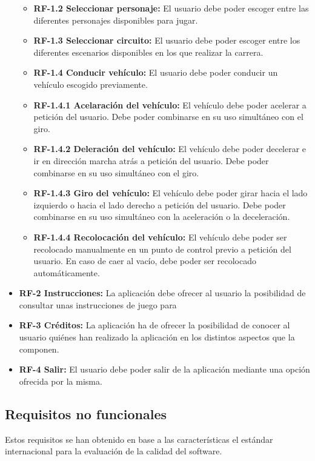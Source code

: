 \begin{itemize}
\begin{itemize}
\begin{itemize}
    	\end{itemize}
    	\item
    		\textbf{RF-1.2 Seleccionar personaje:} El usuario debe poder escoger entre las diferentes personajes disponibles para jugar.
		\item    	
    		\textbf{RF-1.3 Seleccionar circuito:} El usuario debe poder escoger entre los diferentes escenarios disponibles en los que realizar la carrera.
    	\item
    		\textbf{RF-1.4 Conducir vehículo:} El usuario debe poder conducir un vehículo escogido previamente.
			\item 
				\textbf{RF-1.4.1 Acelaración del vehículo:} El vehículo debe poder acelerar a petición del usuario. Debe poder combinarse en su uso simultáneo con el giro.
			\item 
				\textbf{RF-1.4.2 Deleración del vehículo:} El vehículo debe poder decelerar e ir en dirección marcha atrás a petición del usuario. Debe poder combinarse en su uso simultáneo con el giro.
			\item 
				\textbf{RF-1.4.3 Giro del vehículo:} El vehículo debe poder girar hacia el lado izquierdo o hacia el lado derecho a petición del usuario. Debe poder combinarse en su uso simultáneo con la aceleración o la deceleración.
			\item 
				\textbf{RF-1.4.4 Recolocación del vehículo:} El vehículo debe poder ser recolocado manualmente en un punto de control previo a petición del usuario. En caso de caer al vacío, debe poder ser recolocado automáticamente.
    \end{itemize}
    
	\item \textbf{RF-2 Instrucciones:} La aplicación debe ofrecer al usuario la posibilidad de consultar unas instrucciones de juego para 
	\item \textbf{RF-3 Créditos:} La aplicación ha de ofrecer la posibilidad de conocer al usuario quiénes han realizado la aplicación en los distintos aspectos que la componen.
	\item \textbf{RF-4 Salir:} El usuario debe poder salir de la aplicación mediante una opción ofrecida por la misma.
\end{itemize}

\subsection{Requisitos no funcionales}

Estos requisitos se han obtenido en base a las características el estándar internacional para la evaluación de la calidad del software.

